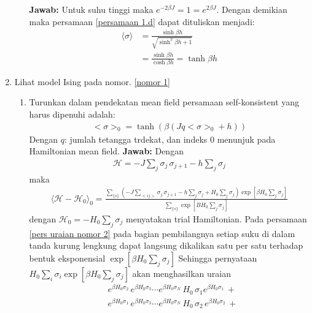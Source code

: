 \documentclass[a4paper , 12pt, cc]{article}
\begin{document}
\begin{enumerate}
\begin{enumerate}
\textbf{Jawab:} \newline 
Untuk suhu tinggi maka $e^{- 2 \beta J} = 1 = e^{2 \beta J} $. Dengan demikian maka persamaan \ref{persamaan 1.d} dapat dituliskan menjadi:
\begin{align}
\langle \sigma \rangle & = \frac{\sinh \beta h}{\sqrt{ \sinh^2 \beta h + 1 }} \nonumber \\
& = \frac{\sinh \beta h }{\cosh \beta h } =\boxed{ \tanh \beta h}
\end{align}
\end{enumerate}
\item Lihat model Ising pada nomor. \ref{nomor 1} 
\begin{enumerate}
\item \label{2a} Turunkan dalam pendekatan mean field persamaan self-konsistent yang harus dipenuhi adalah:
\begin{align}
<\sigma>_0 = \tanh (\beta (Jq <\sigma>_0 + h))
\end{align}
Dengan $q$: jumlah tetangga trdekat, dan indeks 0 menunjuk pada Hamiltonian mean field. \newline
\textbf{Jawab:} \newline 
Dengan 
\begin{align}
\mathcal{H} = - J \sum_j \sigma_j \, \sigma_{j + 1} - h \sum_j \sigma_j 
\end{align}
maka
\begin{align}
 \langle \mathcal{H} - \mathcal{ H}_0 \rangle_0  =\frac{ \sum_{\{s \}} \left( - J \sum_{<ij>} \sigma_j \, \sigma_{j+1}  - h \sum_j \sigma_j  + H_0 \sum_j \sigma_j \right) \exp\left[ \beta H_0 \sum_j \sigma_j \right] }{\sum_{\{ s\}} \exp \left[  B H_0 \sum_j \sigma_j \right ]} \label{pers uraian nomor 2}
\end{align}
dengan  $\mathcal{H}_0  = - H_0 \sum_j \sigma_j $  menyatakan trial Hamiltonian. 
Pada  persamaan \ref{pers uraian nomor 2} pada bagian pembilangnya setiap suku di dalam tanda kurung lengkung  dapat  langsung dikalikan satu per satu terhadap bentuk eksponensial $\exp  [ \beta H_0 \sum_j \sigma_j]$ Sehingga pernyataan $H_0 \sum_i \sigma_i \exp  [ \beta H_0 \sum_j \sigma_j]$ akan menghasilkan uraian
\begin{align}
&e^{\beta H_0 \sigma_2 }\,  e^{\beta H_0 \sigma_3} \cdots e^{\beta H_0 \sigma_N } \, H_0 \, \sigma_1 e^{\beta H_0 \sigma_1} \, +  \nonumber \\
& e^{\beta H_0 \sigma_1} \,  e^{\beta H_0 \sigma_3}  \cdots e^{\beta H_0 \sigma_N}  \,H_0 \, \sigma_2 \, e^{\beta H_0 \sigma_2}   \, + \nonumber  \\

\end{align}
\end{enumerate}
\end{enumerate}
\end{document}

